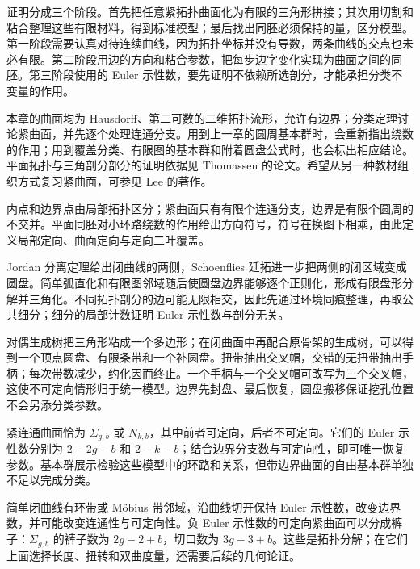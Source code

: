证明分成三个阶段。首先把任意紧拓扑曲面化为有限的三角形拼接；其次用切割和粘合整理这些有限材料，得到标准模型；最后找出同胚必须保持的量，区分模型。第一阶段需要认真对待连续曲线，因为拓扑坐标并没有导数，两条曲线的交点也未必有限。第二阶段用边的方向和粘合参数，把每步边字变化实现为曲面之间的同胚。第三阶段使用的 Euler 示性数，要先证明不依赖所选剖分，才能承担分类不变量的作用。

\ProseParagraphBreak

本章的曲面均为 Hausdorff、第二可数的二维拓扑流形，允许有边界；分类定理讨论紧曲面，并先逐个处理连通分支。用到上一章的圆周基本群时，会重新指出绕数的作用；用到覆盖分类、有限图的基本群和附着圆盘公式时，也会标出相应结论。平面拓扑与三角剖分部分的证明依据见 Thomassen 的论文\cite[第2--4节]{Thomassen1992}。希望从另一种教材组织方式复习紧曲面，可参见 Lee 的著作\cite[第6章]{Lee2011Topological}。








\begin{chaptersummary}
	内点和边界点由局部拓扑区分；紧曲面只有有限个连通分支，边界是有限个圆周的不交并。平面同胚对小环路绕数的作用给出方向符号，符号在换图下相乘，由此定义局部定向、曲面定向与定向二叶覆盖。

	\ProseParagraphBreak

	Jordan 分离定理给出闭曲线的两侧，Schoenflies 延拓进一步把两侧的闭区域变成圆盘。简单弧直化和有限图邻域随后使圆盘边界能够逐个正则化，形成有限盘形分解并三角化。不同拓扑剖分的边可能无限相交，因此先通过环境同痕整理，再取公共细分；细分的局部计数证明 Euler 示性数与剖分无关。

	\ProseParagraphBreak

	对偶生成树把三角形粘成一个多边形；在闭曲面中再配合原骨架的生成树，可以得到一个顶点圆盘、有限条带和一个补圆盘。扭带抽出交叉帽，交错的无扭带抽出手柄；每次带数减少，约化因而终止。一个手柄与一个交叉帽可改写为三个交叉帽，这使不可定向情形归于统一模型。边界先封盘、最后恢复，圆盘搬移保证挖孔位置不会另添分类参数。

	\ProseParagraphBreak

	紧连通曲面恰为 \(\Sigma_{g,b}\) 或 \(N_{k,b}\)，其中前者可定向，后者不可定向。它们的 Euler 示性数分别为 \(2-2g-b\) 和 \(2-k-b\)；结合边界分支数与可定向性，即可唯一恢复参数。基本群展示检验这些模型中的环路和关系，但带边界曲面的自由基本群单独不足以完成分类。

	\ProseParagraphBreak

	简单闭曲线有环带或 Möbius 带邻域，沿曲线切开保持 Euler 示性数，改变边界数，并可能改变连通性与可定向性。负 Euler 示性数的可定向紧曲面可以分成裤子：\(\Sigma_{g,b}\) 的裤子数为 \(2g-2+b\)，切口数为 \(3g-3+b\)。这些是拓扑分解；在它们上面选择长度、扭转和双曲度量，还需要后续的几何论证。
\end{chaptersummary}

